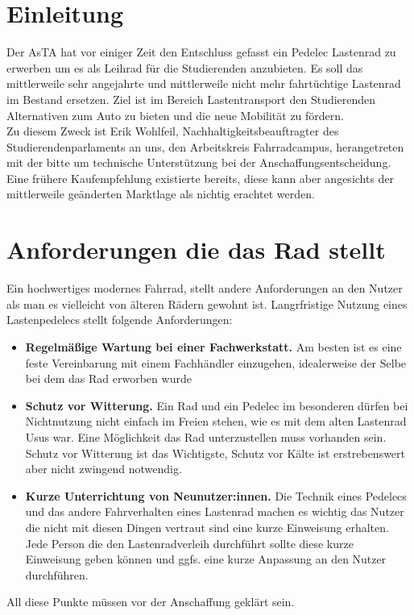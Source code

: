 \documentclass[a4paper,ngerman, 14pt] {scrartcl}
\begin{document}
\section{Einleitung}
Der AsTA hat vor einiger Zeit den Entschluss gefasst ein Pedelec Lastenrad zu erwerben um es als Leihrad für die Studierenden anzubieten. Es soll das mittlerweile sehr angejahrte und mittlerweile nicht mehr fahrtüchtige Lastenrad im Bestand ersetzen. Ziel ist im Bereich Lastentransport den Studierenden Alternativen zum Auto zu bieten und die neue Mobilität zu fördern.\\
Zu diesem Zweck ist Erik Wohlfeil, Nachhaltigkeitsbeauftragter des Studierendenparlaments an uns, den Arbeitskreis Fahrradcampus, herangetreten mit der bitte um technische Unterstützung bei der Anschaffungsentscheidung. Eine frühere Kaufempfehlung existierte bereits, diese kann aber angesichts der mittlerweile geänderten Marktlage als nichtig erachtet werden.\\
\section{Anforderungen die das Rad stellt}
Ein hochwertiges modernes Fahrrad, stellt andere Anforderungen an den Nutzer als man es vielleicht von älteren Rädern gewohnt ist. Langrfristige Nutzung eines Lastenpedelecs stellt folgende Anforderungen:\\
\begin{itemize}
    \item \textbf{Regelmäßige Wartung bei einer Fachwerkstatt.} Am besten ist es eine feste Vereinbarung mit einem Fachhändler einzugehen, idealerweise der Selbe bei dem das Rad erworben wurde
    \item \textbf{Schutz vor Witterung.} Ein Rad und ein Pedelec im besonderen dürfen bei Nichtnutzung nicht einfach im Freien stehen, wie es mit dem alten Lastenrad Usus war. Eine Möglichkeit das Rad unterzustellen muss vorhanden sein. Schutz vor Witterung ist das Wichtigste, Schutz vor Kälte ist erstrebenswert aber nicht zwingend notwendig.
    \item \textbf{Kurze Unterrichtung von Neunutzer:innen.} Die Technik eines Pedelecs und das andere Fahrverhalten eines Lastenrad machen es wichtig das Nutzer die nicht mit diesen Dingen vertraut sind eine kurze Einweisung erhalten. Jede Person die den Lastenradverleih durchführt sollte diese kurze Einweisung geben können und ggfs. eine kurze Anpassung an den Nutzer durchführen.
\end{itemize}
All diese Punkte müssen vor der Anschaffung geklärt sein.
\end{document}

